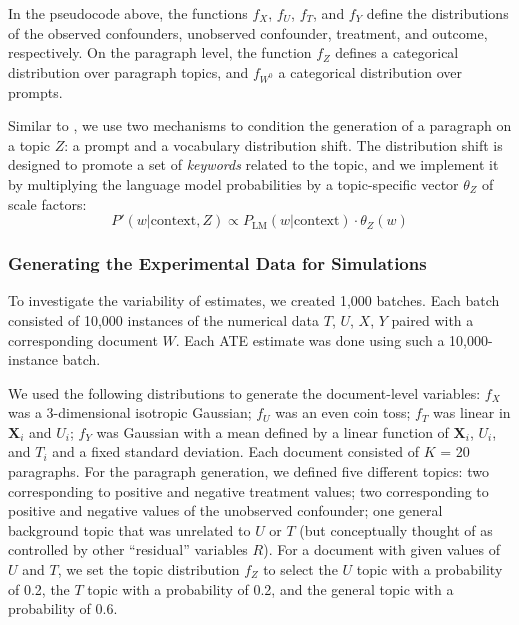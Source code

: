 \documentclass[11pt]{article}
\begin{document}
In the pseudocode above, the functions $f_X$, $f_U$, $f_T$, and $f_Y$ define the distributions of the observed confounders, unobserved confounder, treatment, and outcome, respectively.
On the paragraph level, the function $f_Z$ defines a categorical distribution over paragraph topics, and $f_{W^0}$ a categorical distribution over prompts.

%
Similar to \citet{wooddoughty2021}, we use two mechanisms to condition the generation of a paragraph on a topic $Z$: a prompt and a vocabulary distribution shift.
The distribution shift is designed to promote a set of \emph{keywords} related to the topic, and we implement it by multiplying the language model probabilities by a topic-specific vector $\theta_Z$ of scale factors:
\[
P'(w|\text{context}, Z) \propto P_{\text{LM}}(w|\text{context}) \cdot \theta_Z(w)
\]

\subsubsection{Generating the Experimental Data for Simulations}
\label{app:specific}

To investigate the variability of estimates, we created 1,000 batches. Each batch consisted of 10,000 instances of the numerical data $T$, $U$, $X$, $Y$ paired with a corresponding document $W$. Each ATE estimate was done using such a 10,000-instance batch.

We used the following distributions to generate the document-level variables: $f_X$ was a 3-dimensional isotropic Gaussian; $f_U$ was an even coin toss; $f_T$ was linear in $\bm{X}_i$ and $U_i$; $f_Y$ was Gaussian with a mean defined by a linear function of $\bm{X}_i$, $U_i$, and $T_i$ and a fixed standard deviation.
%
Each document consisted of $K$ = 20 paragraphs. For the paragraph generation, we defined five different topics: two corresponding to positive and negative treatment values; two corresponding to positive and negative values of the unobserved confounder; one general background topic that was unrelated to $U$ or $T$ (but conceptually thought of as controlled by other ``residual'' variables $R$).
For a document with given values of $U$ and $T$, we set the topic distribution $f_Z$ to select the $U$ topic with a probability of 0.2, the $T$ topic with a probability of 0.2, and the general topic with a probability of 0.6.
\end{document}
